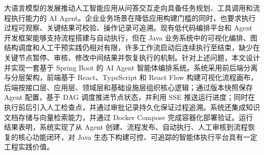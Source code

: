 
\begin{abstractzh}

大语言模型的发展推动人工智能应用从问答交互走向具备任务规划、工具调用和流程执行能力的 AI Agent。企业业务场景在降低应用构建门槛的同时，也要求执行过程可观察、关键结果可校验、操作记录可追溯。现有低代码编排平台和 Agent 开发框架能够支持流程搭建与自动执行，但在 Java 业务系统中的可视化编排、图结构调度和人工干预实践仍相对有限，许多工作流启动后连续执行至结束，缺少在关键节点暂停、审核、修改中间结果并恢复执行的机制。针对上述问题，本文设计并实现一套基于 Spring Boot 的 AI Agent 智能体编排系统。系统采用前后端分离与分层架构，前端基于 React、TypeScript 和 React Flow 构建可视化流程画布，后端按接口层、应用层、领域层和基础设施层组织核心逻辑；通过版本快照保存 Agent 配置，基于 DAG 调度推进节点状态，并利用 SSE 推送运行进度；同时在执行前后引入人工检查点，并通过审批记录持久化保证过程追溯。系统还集成知识文档存储与向量检索能力，并通过 Docker Compose 完成容器化部署验证。运行结果表明，系统实现了从 Agent 创建、流程发布、自动执行、人工审核到流程恢复的核心功能闭环，对 Java 生态下构建可控、可追踪的智能体执行平台具有一定工程实践价值。


\end{abstractzh}

